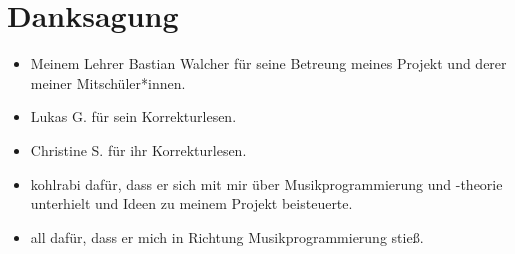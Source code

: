 \documentclass[a4paper,twocolumn]{article}
\begin{document}
\section*{Danksagung}

\begin{itemize}
  \item Meinem Lehrer Bastian Walcher für seine Betreung meines Projekt und derer
    meiner Mitschüler*innen.
  \item Lukas G. für sein Korrekturlesen.
  \item Christine S. für ihr Korrekturlesen.
  \item kohlrabi dafür, dass er sich mit mir über Musikprogrammierung und
    -theorie unterhielt und Ideen zu meinem Projekt beisteuerte.
  \item all dafür, dass er mich in Richtung Musikprogrammierung stieß.
\end{itemize}
\end{document}
